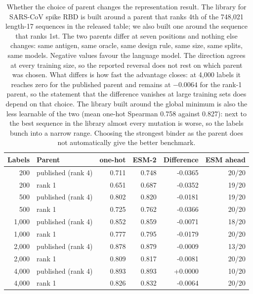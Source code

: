 \documentclass[11pt,a4paper]{article}
\begin{document}
\begin{table}[h]
\caption{Whether the choice of parent changes the representation result. The library for SARS-CoV spike RBD is built around a parent that ranks 4th of the 748{,}021 length-17 sequences in the released table; we also built one around the sequence that ranks 1st. The two parents differ at seven positions and nothing else changes: same antigen, same oracle, same design rule, same size, same splits, same models. Negative values favour the language model. The direction agrees at every training size, so the reported reversal does not rest on which parent was chosen. What differs is how fast the advantage closes: at 4,000 labels it reaches zero for the published parent and remains at $-0.0064$ for the rank-1 parent, so the statement that the difference vanishes at large training sets does depend on that choice. The library built around the global minimum is also the less learnable of the two (mean one-hot Spearman 0.758 against 0.827): next to the best sequence in the library almost every mutation is worse, so the labels bunch into a narrow range. Choosing the strongest binder as the parent does not automatically give the better benchmark.}
\centering
\begin{tabular}{@{}rlrrrr@{}}
\toprule
Labels & Parent & one-hot & ESM-2 & Difference & ESM ahead \\
\midrule
200 & published (rank 4) & 0.711 & 0.748 & -0.0365 & 20/20 \\
200 & rank 1 & 0.651 & 0.687 & -0.0352 & 19/20 \\
500 & published (rank 4) & 0.802 & 0.820 & -0.0181 & 19/20 \\
500 & rank 1 & 0.725 & 0.762 & -0.0366 & 20/20 \\
1,000 & published (rank 4) & 0.852 & 0.859 & -0.0071 & 18/20 \\
1,000 & rank 1 & 0.777 & 0.795 & -0.0179 & 20/20 \\
2,000 & published (rank 4) & 0.878 & 0.879 & -0.0009 & 13/20 \\
2,000 & rank 1 & 0.809 & 0.817 & -0.0081 & 20/20 \\
4,000 & published (rank 4) & 0.893 & 0.893 & +0.0000 & 10/20 \\
4,000 & rank 1 & 0.826 & 0.832 & -0.0064 & 20/20 \\
\bottomrule
\end{tabular}
\end{table}
\end{document}
